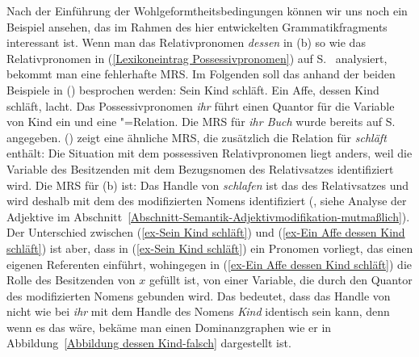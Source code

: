 Nach der Einführung der Wohlgeformtheitsbedingungen können wir uns noch ein Beispiel ansehen, das im
Rahmen des hier entwickelten Grammatikfragments interessant ist. Wenn man das Relativpronomen
\emph{dessen} in (b) so wie das Relativpronomen in (\ref{Lexikoneintrag Possessivpronomen})
auf S.~\pageref{Lexikoneintrag Possessivpronomen} analysiert, bekommt man eine fehlerhafte MRS. Im
Folgenden soll das anhand der beiden Beispiele in () besprochen werden:
\eal
\ex\label{ex-Sein Kind schläft} 
Sein Kind schläft.
\ex\label{ex-Ein Affe dessen Kind schläft}
Ein Affe, dessen Kind schläft, lacht.
\zl
Das Possessivpronomen \emph{ihr} führt einen Quantor für die Variable von Kind ein und eine
"=Relation. Die MRS für \emph{ihr Buch} wurde bereits auf S.\,\pageref{MRS ihr
  Buch} angegeben. () zeigt eine ähnliche MRS, die zusätzlich die Relation für \emph{schläft} enthält:
\ea
\label{MRS ihr Buch-2}
\z
Die Situation mit dem possessiven Relativpronomen liegt anders, weil die Variable des Besitzenden
mit dem Bezugsnomen des Relativsatzes identifiziert wird. Die MRS für (b) ist:
\ea
\label{MRS EIn Affe dessen Kind schläft lacht}
\z
Das Handle von \emph{schlafen} ist das \ltop des Relativsatzes und wird deshalb mit dem \ltop des
modifizierten Nomens identifiziert (, siehe Analyse der Adjektive im Abschnitt~\ref{Abschnitt-Semantik-Adjektivmodifikation-mutmaßlich}). Der Unterschied zwischen (\ref{ex-Sein Kind
  schläft}) und (\ref{ex-Ein Affe dessen Kind schläft}) ist aber, dass in (\ref{ex-Sein Kind
  schläft}) ein Pronomen vorliegt, das einen eigenen Referenten einführt, wohingegen in (\ref{ex-Ein
  Affe dessen Kind schläft}) die Rolle des Besitzenden von $x$ gefüllt ist, \dash von einer
Variable, die durch den Quantor des modifizierten Nomens gebunden wird. Das bedeutet, dass das
Handle von  nicht wie bei \emph{ihr} mit dem Handle des Nomens \emph{Kind}
identisch sein kann, denn wenn es das wäre, bekäme man einen Dominanzgraphen wie er in Abbildung~\ref{Abbildung dessen Kind-falsch}
dargestellt ist.
